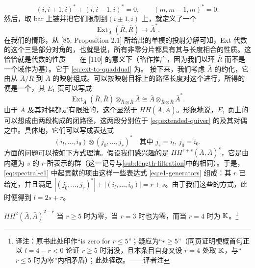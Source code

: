 \begin{equation*}
(i,i+1,i)^*+(i,i-1,i)^*=0,\qquad (m,m-1,m)^*=0.
\end{equation*}
然后，取 bar 上链并把它们限制到\trGenerator{}$(i\pm 1,i)$ 上，就定义了一个\trCanonical\trHomomorphism
\begin{equation}\label{eq:ext-to-quaddual}
\operatorname{Ext}_{\bar{A}}(\bar{R},\bar{R})\longrightarrow\bar{A}^*.
\end{equation}
在我们的情形，从 [85, Proposition 2.1] 所给出的单模的投射分解可知，Ext 代数的这个三\trGrading{}是部分对角的，也就是说，所有非零分片都具有其\trCohomology\trGrading{}与长度\trGrading{}相合的性质。这恰恰就是\trKoszul{}代数的性质——在 [110] 的意义下（略作推广，因为我们以\trSemisimple{}环 $\bar{R}$ 而不是一个域作为基）。它\trEquivalence{}于 \eqref{eq:ext-to-quaddual} 为\trIsomorphism。
接下来，我们考虑 $\bar{A}$ 的约化\trHochschild\trCochainComplex，它由从 $\bar{A}/\bar{R}$ 到 $\bar{A}$ 的\trMultilinear{}映射组成。可以按映射目标上的路径长度对这个\trComplex{}进行\trFiltration，所得的便是一个\trSpectralSequence，其 $E_1$ 页可以写成
\begin{equation}\label{eq:spectral-e1}
\operatorname{Ext}_{\bar{A}}(\bar{R},\bar{R})\otimes_{\bar{R}\otimes\bar{R}}\bar{A}\cong
\bar{A}\otimes_{\bar{R}\otimes\bar{R}}\bar{A}^*.
\end{equation}
由于 $\bar{A}$ 及其对偶都是有限维的，这个\trSpectralSequence{}显然\trConvergence{}于 $HH(\bar{A},\bar{A})$。形象地说，$E_1$ 页上的\trGenerator{}可以想成由两段构成的闭路径，这两段分别位于 \eqref{eq:extended-quiver} 的\trQuiver{}及其对偶之中。具体地，它们可以写成表达式
\begin{equation}\label{eq:e1-generators}
(i_l,\ldots,i_0)\otimes(j_0,\ldots,j_r)^*
\quad\text{其中 } j_r=i_l,\ j_0=i_0.
\end{equation}
\trGrading{}方面的问题可以按如下方式理清。假设我们感兴趣的是 $HH^{r+s}(\bar{A},\bar{A})^s$，它是由内蕴\trDegree{}为 $s$ 的 $r$-\trLinear\trHochschild\trCocycle{}所表示的群（这一记号与\cref{sub:length-filtration}中的相同）。于是，\eqref{eq:spectral-e1} 中起贡献的项由这样一些表达式 \eqref{eq:e1-generators} 组成：其 $r$ 已给定，并且满足 $|(j_0,\ldots,j_r)^*|+|(i_l,\ldots,i_0)|=r+s$。由于我们这些\trQuiver{}的\trGrading{}方式，此时便得到 $l=2s+r$。
\begin{lemma}\label{thm:extended-hh-pieces}
$HH^2(\bar{A},\bar{A})^{2-r}$ 当 $r\ge 5$ 时为零，当 $r=3$ 时也为零，而当 $r=4$ 时为 $\mathbb{K}$。\footnote{译注：原书此处印作“is zero for $r\le 5$”；疑应为“$r\ge 5$”（同页证明梗概首句正以 $l=4-r<0$ 论证 $r\ge 5$ 时消没，且本条目自身又设 $r=4$ 处取 $\mathbb{K}$，与“$r\le 5$ 时为零”内相矛盾）；此处径改。——译者注}
\end{lemma}
